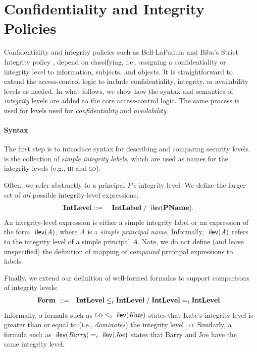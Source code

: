 \section{Confidentiality and Integrity Policies}

Confidentiality and integrity policies such as Bell-LaPadula
\cite{BL73} and Biba's Strict Integrity policy \cite{Biba77}, depend
on classifying, i.e., assigning a confidentiality or integrity level
to information, subjects, and objects. It is straightforward to extend
the access-control logic to include confidentiality, integrity, or
availability levels as needed. In what follows, we show how the syntax
and semantics of \emph{integrity} levels are added to the core
access-control logic. The same process is used for levels used for
\emph{confidentiality} and \emph{availability}.

\paragraph{Syntax}

The first step is to introduce syntax for describing and comparing
security levels. \IntLabelConst is the collection of \emph{simple
  integrity labels}, which are used as names for the integrity
levels (e.g., \textsc{hi} and \textsc{lo}).

Often, we refer abstractly to a principal $P$'s integrity level.  We
define the larger set \IntLevel of \emph{all} possible integrity-level
expressions:
\begin{eqnarray*}
  \textbf{IntLevel} &\; {:}{:}{=} \;& \textbf{IntLabel} \;/\;  \text{\textsf{ ilev}}(\textbf{PName}).
\end{eqnarray*}
An integrity-level expression is either a simple integrity label or an
expression of the form $\text{\textsf{ ilev}}(A)$, where $A$ is a \emph{simple
  principal name}.  Informally, $\text{\textsf{ ilev}}(A)$ refers to the integrity
level of a simple principal $A$. Note, we do not define (and leave
unspecified) the definition of mapping of \emph{compound} principal
expressions to labels.

Finally, we extend our definition of well-formed formulas to support
comparisons of integrity levels:
\begin{eqnarray*}
    \textbf{Form } &::=&  \textbf{IntLevel} \leq_i \textbf{IntLevel} \;/\; \textbf{IntLevel} =_i \textbf{IntLevel} 
\end{eqnarray*}
Informally, a formula such as $\textsc{lo} \leq_i \text{\textsf{ ilev}}(\textit{Kate})$
states that Kate's integrity level is greater than or equal to (i.e.,
\emph{dominates}) the integrity level \textsc{lo}.  Similarly, a
formula such as $\text{\textsf{ ilev}}(\textit{Barry}) =_i \text{\textsf{ ilev}}(\textit{Joe})$ states that
Barry and Joe have the same integrity level.

